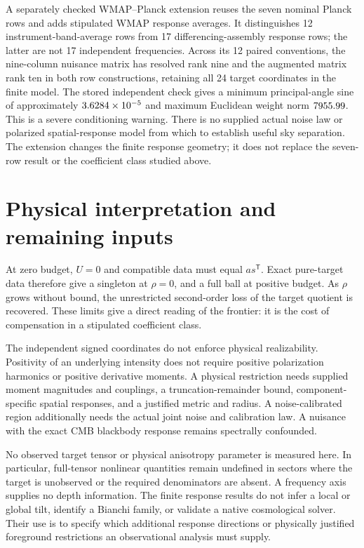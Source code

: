 \documentclass[aps,prd,onecolumn,11pt,nofootinbib,notitlepage]{revtex4-2}
\begin{document}
A separately checked WMAP--Planck extension reuses the seven nominal Planck rows and adds stipulated WMAP response averages. It distinguishes 12 instrument-band-average rows from 17 differencing-assembly response rows; the latter are not 17 independent frequencies. Across its 12 paired conventions, the nine-column nuisance matrix has resolved rank nine and the augmented matrix rank ten in both row constructions, retaining all 24 target coordinates in the finite model. The stored independent check gives a minimum principal-angle sine of approximately $3.6284\times10^{-5}$ and maximum Euclidean weight norm $7955.99$. This is a severe conditioning warning. There is no supplied actual noise law or polarized spatial-response model from which to establish useful sky separation. The extension changes the finite response geometry; it does not replace the seven-row result or the coefficient class studied above.

\section{Physical interpretation and remaining inputs}

At zero budget, $U=0$ and compatible data must equal $as^{\mathsf T}$. Exact pure-target data therefore give a singleton at $\rho=0$, and a full ball at positive budget. As $\rho$ grows without bound, the unrestricted second-order loss of the target quotient is recovered. These limits give a direct reading of the frontier: it is the cost of compensation in a stipulated coefficient class.

The independent signed coordinates do not enforce physical realizability. Positivity of an underlying intensity does not require positive polarization harmonics or positive derivative moments. A physical restriction needs supplied moment magnitudes and couplings, a truncation-remainder bound, component-specific spatial responses, and a justified metric and radius. A noise-calibrated region additionally needs the actual joint noise and calibration law. A nuisance with the exact CMB blackbody response remains spectrally confounded.

No observed target tensor or physical anisotropy parameter is measured here. In particular, full-tensor nonlinear quantities remain undefined in sectors where the target is unobserved or the required denominators are absent. A frequency axis supplies no depth information. The finite response results do not infer a local or global tilt, identify a Bianchi family, or validate a native cosmological solver. Their use is to specify which additional response directions or physically justified foreground restrictions an observational analysis must supply.



\end{document}
